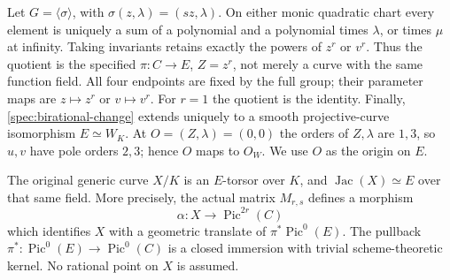 Let $G=\langle\sigma\rangle$, with
$\sigma(z,\lambda)=(sz,\lambda)$.  On either monic quadratic chart
every element is uniquely a sum of a polynomial and a polynomial
times $\lambda$, or times $\mu$ at infinity.  Taking invariants
retains exactly the powers of $z^r$ or $v^r$.  Thus the quotient is
the specified $\pi:C\to E$, $Z=z^r$, not merely a curve with the
same function field.  All four endpoints are fixed by the full
group; their parameter maps are $z\mapsto z^r$ or $v\mapsto v^r$.
For $r=1$ the quotient is the identity.  Finally,
\eqref{spec:birational-change} extends uniquely to a smooth
projective-curve isomorphism $E\simeq W_K$.  At
$O=(Z,\lambda)=(0,0)$ the orders of $Z,\lambda$ are $1,3$, so
$u,v$ have pole orders $2,3$; hence $O$ maps to $O_W$.  We use
$O$ as the origin on $E$.

\begin{theorem}\label{spec:jacobian}
The original generic curve $X/K$ is an $E$-torsor over $K$, and
$\operatorname{Jac}(X)\simeq E$ over that same field.  More precisely,
the actual matrix $M_{r,s}$ defines a morphism
\[
\alpha:X\longrightarrow\operatorname{Pic}^{2r}(C)
\]
which identifies $X$ with a geometric translate of
$\pi^*\operatorname{Pic}^0(E)$.  The pullback
$\pi^*:\operatorname{Pic}^0(E)\to\operatorname{Pic}^0(C)$ is a
closed immersion with trivial scheme-theoretic kernel.
No rational point on $X$ is assumed.
\end{theorem}

